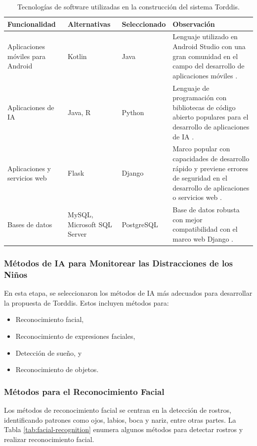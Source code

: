\documentclass[a4paper,fleqn]{cas-sc}
\begin{document}
	\begin{table}[hbt!]
		\caption{Tecnologías de software utilizadas en la construcción del sistema Torddis.}
		\label{table:software-technologies}
		\centering
		\begin{tabular}{p{}p{}p{}p{}}
			\hline
			\multicolumn{1}{l}{\textbf{Funcionalidad}} & \multicolumn{1}{l}{\textbf{Alternativas }} & \multicolumn{1}{l}{\textbf{Seleccionado}} & \multicolumn{1}{l}{\textbf{Observación}} \\ \hline
			Aplicaciones móviles para Android & Kotlin & Java & Lenguaje utilizado en Android Studio con una gran comunidad en el campo del desarrollo de aplicaciones móviles \citep{Sharma2021Real-Time}. \\
			Aplicaciones de IA & Java, R & Python & Lenguaje de programación con bibliotecas de código abierto populares para el desarrollo de aplicaciones de IA \citep{Cai2005OnThePerformance}. \\
			Aplicaciones y servicios web & Flask & Django & Marco popular con capacidades de desarrollo rápido y previene errores de seguridad en el desarrollo de aplicaciones o servicios web \citep{Puneet2022ADjango}. \\
			Bases de datos & MySQL, Microsoft SQL Server & PostgreSQL & Base de datos robusta con mejor compatibilidad con el marco web Django \citep{Puneet2022ADjango}. \\ \hline
		\end{tabular}
	\end{table}
	
	\subsubsection*{Métodos de IA para Monitorear las Distracciones de los Niños}
	
	En esta etapa, se seleccionaron los métodos de IA más adecuados para desarrollar la propuesta de Torddis. Estos incluyen métodos para:
	\begin{itemize}
		\item Reconocimiento facial,
		\item Reconocimiento de expresiones faciales,
		\item Detección de sueño, y
		\item Reconocimiento de objetos.
	\end{itemize}
	
	\subsubsection*{Métodos para el Reconocimiento Facial}
	Los métodos de reconocimiento facial se centran en la detección de rostros, identificando patrones como ojos, labios, boca y nariz, entre otras partes. La Tabla \ref{tab:facial-recognition} enumera algunos métodos para detectar rostros y realizar reconocimiento facial.
	
\end{document}
